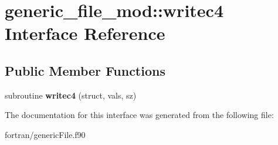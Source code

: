 \hypertarget{interfacegeneric__file__mod_1_1writec4}{}\section{generic\+\_\+file\+\_\+mod\+:\+:writec4 Interface Reference}
\label{interfacegeneric__file__mod_1_1writec4}
\subsection*{Public Member Functions}
\begin{DoxyCompactItemize}
\item 
\mbox{\label{interfacegeneric__file__mod_1_1writec4_a5bc2e2f567f7ea9a2798e2ca4b69f75e}} 
subroutine {\bfseries writec4} (struct, vals, sz)
\end{DoxyCompactItemize}


The documentation for this interface was generated from the following file\+:\begin{DoxyCompactItemize}
\item 
fortran/generic\+File.\+f90\end{DoxyCompactItemize}
